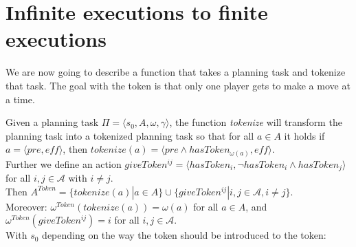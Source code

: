 \section{Infinite executions to finite executions}

We are now going to describe a function that takes a planning task and tokenize that task. The goal with the token is that only one player gets to make a move at a time.

Given a planning task $\Pi = \langle s_0, A, \omega, \gamma \rangle $, the function \textit{tokenize} will transform the planning task into a tokenized planning task so that for all $a \in A$ it holds
 if $a = \langle pre, \textit{eff} \rangle$, then
   $tokenize(a) =\langle pre \wedge hasToken_{\omega(a)}, \textit{eff} \rangle$. \\
Further we define an action
    $ giveToken^{ij} = \langle hasToken_i, \neg hasToken_i \wedge hasToken_j \rangle $
    for all $i,j \in \mathcal{A}$ with $i \not = j$. \\
Then $ A^{Token}=\{tokenize(a)|a \in A\} \cup \{giveToken^{ij}|i,j \in \mathcal{A}, i \not = j\}$. \\
Moreover: $\omega^{Token}(tokenize(a))= \omega(a)$ for all $a \in A$,
and $\omega^{Token}(giveToken^{ij}) = i$ for all $i,j \in \mathcal{A}$. \\
With $s_0$ depending on the way the token should be introduced to the token:

